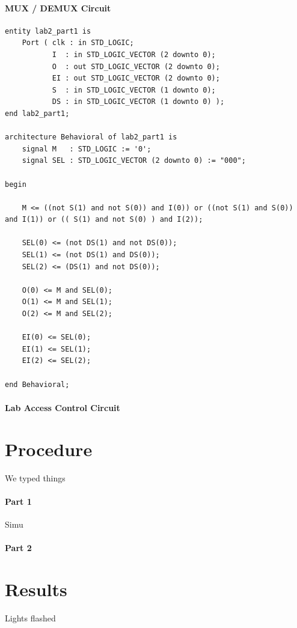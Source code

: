 \documentclass{article}
\begin{document}
    \paragraph{MUX / DEMUX Circuit}


    \begin{lstlisting}
entity lab2_part1 is
    Port ( clk : in STD_LOGIC;
           I  : in STD_LOGIC_VECTOR (2 downto 0);
           O  : out STD_LOGIC_VECTOR (2 downto 0);
           EI : out STD_LOGIC_VECTOR (2 downto 0);
           S  : in STD_LOGIC_VECTOR (1 downto 0);
           DS : in STD_LOGIC_VECTOR (1 downto 0) );
end lab2_part1;

architecture Behavioral of lab2_part1 is
    signal M   : STD_LOGIC := '0';
    signal SEL : STD_LOGIC_VECTOR (2 downto 0) := "000";
    
begin

    M <= ((not S(1) and not S(0)) and I(0)) or ((not S(1) and S(0)) and I(1)) or (( S(1) and not S(0) ) and I(2));
    
    SEL(0) <= (not DS(1) and not DS(0));
    SEL(1) <= (not DS(1) and DS(0));
    SEL(2) <= (DS(1) and not DS(0)); 
    
    O(0) <= M and SEL(0);
    O(1) <= M and SEL(1);
    O(2) <= M and SEL(2);
    
    EI(0) <= SEL(0);
    EI(1) <= SEL(1);
    EI(2) <= SEL(2);

end Behavioral;
    \end{lstlisting}

    \paragraph{Lab Access Control Circuit}

    \section{Procedure}
    We typed things

    \paragraph{Part 1}

    Simu

    \paragraph{Part 2}


    \section{Results}
    Lights flashed
\end{document}
